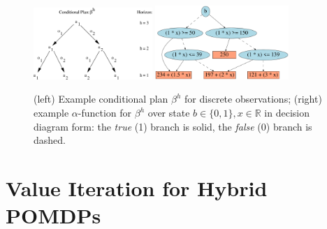 \documentclass{article} %
\begin{document}
\begin{figure}[t!]
\begin{center}
\includegraphics[width=0.4\textwidth]{pics/cond_plan2.pdf}
\hspace{10mm}
\includegraphics[width=0.45\textwidth]{pics/dag2.pdf}
\end{center}
\vspace{-2mm}
\caption{\footnotesize (left) Example conditional plan $\beta^h$ for
discrete observations; (right) example $\alpha$-function for $\beta^h$
over state $b \in \{0,1\}, x \in \mathbb{R}$ in decision
diagram form: the \emph{true} (1) branch is solid, the \emph{false} (0) branch is
dashed.}
\label{fig:cond_plan}
\end{figure}

\section{Value Iteration for Hybrid POMDPs}
\end{document}
